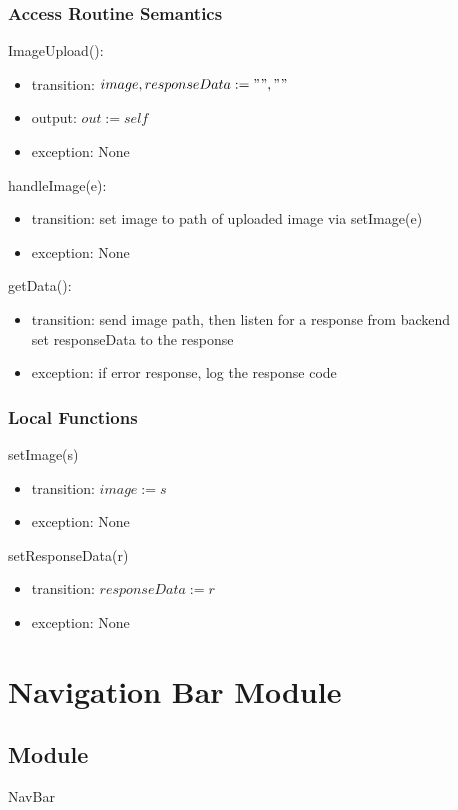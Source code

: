 \documentclass[12pt, titlepage]{article}
\begin{document}
\subsubsection{Access Routine Semantics}
ImageUpload():
\begin{itemize}
	\item transition: $image, responseData := "", ""$
	\item output: $out := self$
	\item exception: None
\end{itemize}
\noindent
handleImage(e):
\begin{itemize}
	\item transition: set image to path of uploaded image via setImage(e)
	\item exception: None
\end{itemize}
\noindent
getData():
\begin{itemize}
	\item transition: send image path, then listen for a response from 
	backend\\ set responseData to the response
	\item exception: if error response, log the response code
\end{itemize}


\subsubsection{Local Functions}
\noindent setImage(s)
\begin{itemize}
	\item transition: $ image :=s $
	\item exception: None
\end{itemize}
\noindent setResponseData(r)
\begin{itemize}
	\item transition: $ responseData:=r $
	\item exception: None
\end{itemize}
\newpage
\section{Navigation Bar Module} \label{Navbar}
\subsection{Module}
NavBar
\end{document}
